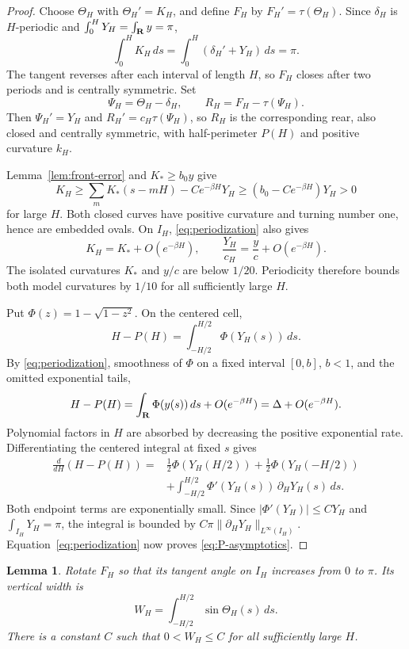 \documentclass[11pt]{article}
\numberwithin{equation}{section}
\newtheorem{lemma}[theorem]{Lemma}
\newcommand{\R}{{\bf R}}
\newcommand{\abs}[1]{\lvert #1\rvert}
\newcommand{\norm}[1]{\lVert #1\rVert}
\begin{document}
\begin{proof}
Choose \(\Theta_H\) with \(\Theta_H'=K_H\), and define \(F_H\) by
\(F_H'=\tau(\Theta_H)\). Since
\(\delta_H\) is \(H\)-periodic and \(\int_0^H Y_H=\int_\R y=\pi\),
\[
  \int_0^H K_H\,ds=\int_0^H(\delta_H'+Y_H)\,ds=\pi.
\]
The tangent reverses after each interval of length \(H\), so \(F_H\)
closes after two periods and is centrally symmetric. Set
\[
  \Psi_H=\Theta_H-\delta_H,\qquad R_H=F_H-\tau(\Psi_H).
\]
Then \(\Psi_H'=Y_H\) and \(R_H'=c_H\tau(\Psi_H)\), so \(R_H\) is the
corresponding rear, also closed and centrally symmetric, with half-perimeter
\(P(H)\) and positive curvature \(k_H\).

Lemma~\ref{lem:front-error} and \(K_*\geq b_0y\) give
\[
  K_H\geq\sum_m K_*(s-mH)-Ce^{-\beta H}Y_H
       \geq(b_0-Ce^{-\beta H})Y_H>0
\]
for large \(H\). Both closed curves have positive curvature and turning
number one, hence are embedded ovals. On \(I_H\),
\eqref{eq:periodization} also gives
\[
  K_H=K_*+O(e^{-\beta H}),\qquad
  \frac{Y_H}{c_H}=\frac yc+O(e^{-\beta H}).
\]
The isolated curvatures \(K_*\) and \(y/c\) are below \(1/20\).
Periodicity therefore bounds both model curvatures by \(1/10\) for all
sufficiently large \(H\).

Put \(\Phi(z)=1-\sqrt{1-z^2}\). On the centered cell,
\[
  H-P(H)=\int_{-H/2}^{H/2}\Phi(Y_H(s))\,ds.
\]
By \eqref{eq:periodization}, smoothness of \(\Phi\) on a fixed interval
\([0,b]\), \(b<1\), and the omitted exponential tails,
\[
  H-P(H)=\int_\R\Phi(y(s))\,ds+O(e^{-\beta H})
        =\Delta+O(e^{-\beta H}).
\]
Polynomial factors in \(H\) are absorbed by decreasing the positive
exponential rate. Differentiating the centered integral at fixed
\(s\) gives
\begin{align*}
  \frac d{dH}(H-P(H))
  ={}&\frac12\Phi(Y_H(H/2))+\frac12\Phi(Y_H(-H/2))\\
     &+\int_{-H/2}^{H/2}\Phi'(Y_H(s))\,\partial_HY_H(s)\,ds.
\end{align*}
Both endpoint terms are exponentially small. Since
\(\abs{\Phi'(Y_H)}\leq C Y_H\) and \(\int_{I_H}Y_H=\pi\), the integral
is bounded by \(C\pi\norm{\partial_HY_H}_{L^\infty(I_H)}\).
Equation~\eqref{eq:periodization} now proves \eqref{eq:P-asymptotics}.
\end{proof}

\begin{lemma}\label{lem:width}
Rotate \(F_H\) so that its tangent angle on \(I_H\) increases from \(0\) to
\(\pi\). Its vertical width is
\[
  W_H=\int_{-H/2}^{H/2}\sin\Theta_H(s)\,ds.
\]
There is a constant \(C\) such that \(0<W_H\leq C\) for all sufficiently
large \(H\).
\end{lemma}
\end{document}
